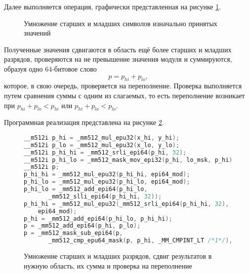 Далее выполняется операция, графически представленная на рисунке \ref{eq: vector vertical operation example}.
\begin{figure}[ht]
\centering
\caption{Умножение старших и младших символов изначально принятых значений}
\label{eq: vector vertical operation example}
\end{figure}

Полученные значения сдвигаются в область ещё более старших и младших разрядов, проверяются на не превышение значения модуля и суммируются, образуя одно 64-битовое слово
$$
p = p_{hi} + p_{lo},
$$
которое, в свою очередь, проверяется на переполнение.
Проверка выполняется путем сравнения суммы с одним из слагаемых, то есть переполнение возникает при $p_{hi}+p_{lo} < p_{hi}$  или $p_{hi}+p_{lo} < p_{lo}$.

Программная реализация представлена на рисунке \ref{fig: avx512 32 bit multiplication}.
\begin{figure}[ht]
\centering
\begin{lstlisting}[language=C]
__m512i p_hi = _mm512_mul_epu32(x_hi, y_hi);
__m512i p_lo = _mm512_mul_epu32(x_lo, y_lo);
__m512i p_hi_hi = _mm512_srli_epi64(p_hi, 32);
__m512i p_hi_lo = _mm512_mask_mov_epi32(p_hi, lo_msk, p_hi);
__m512i p;
p_hi_hi = _mm512_mul_epu32(p_hi_hi, epi64_mod);
p_hi_lo = _mm512_mul_epu32(p_hi_lo, epi64_mod);
p_hi_lo = _mm512_add_epi64(p_hi_lo,
       _mm512_slli_epi64(p_hi_hi, 32));
p_hi_hi = _mm512_mul_epu32(_mm512_srli_epi64(p_hi_hi, 32),
	epi64_mod);
p_hi = _mm512_add_epi64(p_hi_lo, p_hi_hi);
p = _mm512_add_epi64(p_hi, p_lo);
p = _mm512_mask_sub_epi64(p,
       _mm512_cmp_epu64_mask(p, p_hi, _MM_CMPINT_LT /*1*/), p, m);
\end{lstlisting}
\caption{Умножение старших и младших разрядов, сдвиг результатов в нужную область, их сумма и проверка на переполнение}
\label{fig: avx512 32 bit multiplication}
\end{figure}

